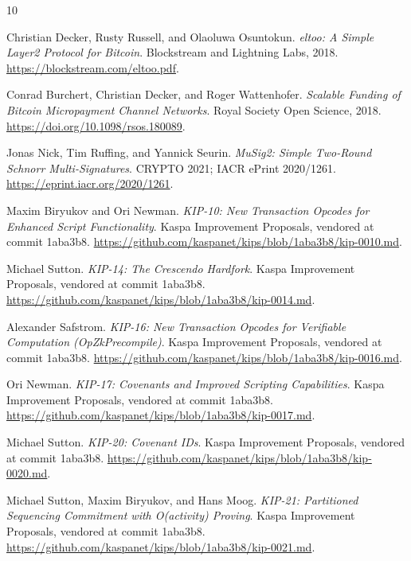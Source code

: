 \documentclass[10pt,a4paper]{article}
\begin{document}
\begin{thebibliography}{10}
\small

Christian Decker, Rusty Russell, and Olaoluwa Osuntokun.
\newblock \emph{eltoo: A Simple Layer2 Protocol for Bitcoin}.
\newblock Blockstream and Lightning Labs, 2018.
\newblock \url{https://blockstream.com/eltoo.pdf}.

Conrad Burchert, Christian Decker, and Roger Wattenhofer.
\newblock \emph{Scalable Funding of Bitcoin Micropayment Channel Networks}.
\newblock Royal Society Open Science, 2018.
\newblock \url{https://doi.org/10.1098/rsos.180089}.

Jonas Nick, Tim Ruffing, and Yannick Seurin.
\newblock \emph{MuSig2: Simple Two-Round Schnorr Multi-Signatures}.
\newblock CRYPTO 2021; IACR ePrint 2020/1261.
\newblock \url{https://eprint.iacr.org/2020/1261}.

Maxim Biryukov and Ori Newman.
\newblock \emph{KIP-10: New Transaction Opcodes for Enhanced Script Functionality}.
\newblock Kaspa Improvement Proposals, vendored at commit 1aba3b8.
\newblock \url{https://github.com/kaspanet/kips/blob/1aba3b8/kip-0010.md}.

Michael Sutton.
\newblock \emph{KIP-14: The Crescendo Hardfork}.
\newblock Kaspa Improvement Proposals, vendored at commit 1aba3b8.
\newblock \url{https://github.com/kaspanet/kips/blob/1aba3b8/kip-0014.md}.

Alexander Safstrom.
\newblock \emph{KIP-16: New Transaction Opcodes for Verifiable Computation (OpZkPrecompile)}.
\newblock Kaspa Improvement Proposals, vendored at commit 1aba3b8.
\newblock \url{https://github.com/kaspanet/kips/blob/1aba3b8/kip-0016.md}.

Ori Newman.
\newblock \emph{KIP-17: Covenants and Improved Scripting Capabilities}.
\newblock Kaspa Improvement Proposals, vendored at commit 1aba3b8.
\newblock \url{https://github.com/kaspanet/kips/blob/1aba3b8/kip-0017.md}.

Michael Sutton.
\newblock \emph{KIP-20: Covenant IDs}.
\newblock Kaspa Improvement Proposals, vendored at commit 1aba3b8.
\newblock \url{https://github.com/kaspanet/kips/blob/1aba3b8/kip-0020.md}.

Michael Sutton, Maxim Biryukov, and Hans Moog.
\newblock \emph{KIP-21: Partitioned Sequencing Commitment with O(activity) Proving}.
\newblock Kaspa Improvement Proposals, vendored at commit 1aba3b8.
\newblock \url{https://github.com/kaspanet/kips/blob/1aba3b8/kip-0021.md}.


\end{thebibliography}
\end{document}
